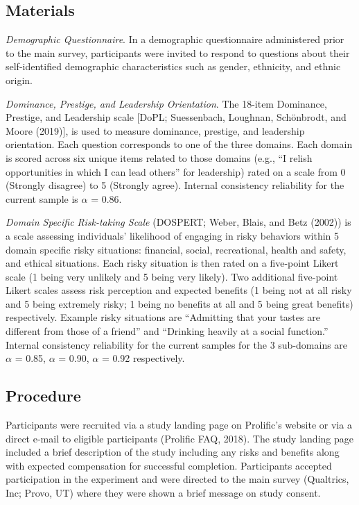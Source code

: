 \documentclass[
  english,
  man]{apa6}
\begin{document}
\hypertarget{materials}{%
\subsection{Materials}\label{materials}}

\emph{Demographic Questionnaire}. In a demographic questionnaire administered prior to the main survey, participants were invited to respond to questions about their self-identified demographic characteristics such as gender, ethnicity, and ethnic origin.

\emph{Dominance, Prestige, and Leadership Orientation}. The 18-item Dominance, Prestige, and Leadership scale {[}DoPL; Suessenbach, Loughnan, Schönbrodt, and Moore (2019){]}, is used to measure dominance, prestige, and leadership orientation. Each question corresponds to one of the three domains. Each domain is scored across six unique items related to those domains (e.g., ``I relish opportunities in which I can lead others'' for leadership) rated on a scale from 0 (Strongly disagree) to 5 (Strongly agree). Internal consistency reliability for the current sample is \(\alpha\) = 0.86.

\emph{Domain Specific Risk-taking Scale} (DOSPERT; Weber, Blais, and Betz (2002)) is a scale assessing individuals' likelihood of engaging in risky behaviors within 5 domain specific risky situations: financial, social, recreational, health and safety, and ethical situations. Each risky situation is then rated on a five-point Likert scale (1 being very unlikely and 5 being very likely). Two additional five-point Likert scales assess risk perception and expected benefits (1 being not at all risky and 5 being extremely risky; 1 being no benefits at all and 5 being great benefits) respectively. Example risky situations are ``Admitting that your tastes are different from those of a friend'' and ``Drinking heavily at a social function.'' Internal consistency reliability for the current samples for the 3 sub-domains are \(\alpha\) = 0.85, \(\alpha\) = 0.90, \(\alpha\) = 0.92 respectively.

\hypertarget{procedure}{%
\subsection{Procedure}\label{procedure}}

Participants were recruited via a study landing page on Prolific's website or via a direct e-mail to eligible participants (Prolific FAQ, 2018). The study landing page included a brief description of the study including any risks and benefits along with expected compensation for successful completion. Participants accepted participation in the experiment and were directed to the main survey (Qualtrics, Inc; Provo, UT) where they were shown a brief message on study consent.
\end{document}
